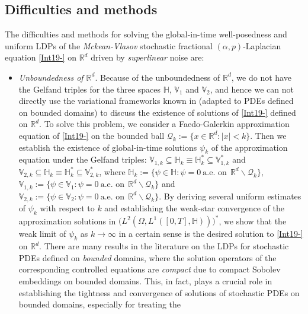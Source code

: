\documentclass[11pt]{article}
\numberwithin{equation}{section}
\begin{document}
\subsection{Difficulties and methods}
The difficulties and methods
for solving the
global-in-time well-posedness and uniform
LDPs of the
\emph{Mckean-Vlasov}
stochastic fractional $(\alpha,p)$-Laplacian equation \eqref{Int19-} on $\mathbb{R}^d$ driven by \emph{superlinear} noise are:

\begin{itemize}
  \item \emph{Unboundedness of $\mathbb{R}^d$}. Because of the unboundedness of $\mathbb{R}^d$, we do not have the Gelfand triples for the three spaces $\mathbb{H}$, $\mathbb{V}_1$ and $\mathbb{V}_2$, and hence we can not directly use the variational
frameworks known in \cite{Barbu2010,Caraballo4,Krylov,LR1,
Minty,rwangma} (adapted to PDEs defined on bounded domains) to discuss the existence of solutions of \eqref{Int19-} defined on $\mathbb{R}^d$. To solve this problem, we consider a Faedo-Galerkin approximation equation of \eqref{Int19-} on the bounded ball
$\mathcal{Q}_{k}:=\{x\in\mathbb{R}^d: |x|< k\}$. Then we establish the existence of global-in-time
solutions $\psi_k$ of the approximation equation under the Gelfand triples:
$\mathbb{V}_{1,k}\subseteq \mathbb{H}_k\equiv \mathbb{H}_k^*\subseteq \mathbb{V}_{1,k}^*$ and $ \mathbb{V}_{2,k}\subseteq \mathbb{H}_k\equiv \mathbb{H}_k^*\subseteq \mathbb{V}^*_{2,k}$,  where
$\mathbb{H}_k:=\big\{\psi\in \mathbb{H}: \psi=0 \ \mbox{a.e. on}\ \ \mathbb{R}^d\backslash\mathcal{Q}_k\big\}$,
$\mathbb{V}_{1,k}:=\big\{\psi\in\mathbb{V}_{1}: \psi=0 \ \mbox{a.e. on}\ \ \mathbb{R}^d\backslash\mathcal{Q}_k\big\}$ and
$\mathbb{V}_{2,k}:=\big\{\psi\in \mathbb{V}_{2}: \psi=0 \ \mbox{a.e. on}\ \ \mathbb{R}^d\backslash\mathcal{Q}_k\big\}$. By deriving  several uniform estimates of  $\psi_k$ with respect to $k$ and establishing
the weak-star convergence of the approximation solutions in $\big(L^ 2(\Omega,
				L^1([0,T],\mathbb{H} ))
				\big)
				^*$, we show
that the weak limit of $\psi_k$ as $k\rightarrow\infty$ in a certain sense
is the desired solution
to \eqref{Int19-} on $\mathbb{R}^d$.  There are many  results
in the literature
 on the LDPs for  stochastic PDEs defined on \emph{bounded} domains, where the solution
operators of the corresponding controlled equations are \emph{compact} due to compact Sobolev embeddings
on bounded domains. This, in fact, plays a crucial role in establishing the tightness and
convergence of solutions of stochastic PDEs on bounded domains, especially for treating the

\end{itemize}
\end{document}

